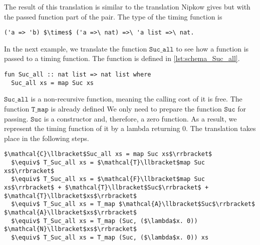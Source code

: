 The result of this translation is similar to the translation Nipkow gives but with the passed function part of the pair.
The type of the timing function is
\begin{lstlisting}[language=translation,mathescape=true,keepspaces]
  ('a => 'b) $\times$ ('a =>\ nat) =>\ 'a list =>\ nat.
\end{lstlisting}

In the next example, we translate the function $\texttt{Suc\_all}$ to see how a function is passed to a timing function.
The function is defined in \autoref{lst:schema_Suc_all}.

\begin{lstlisting}[language=isabelle,caption=Example function increasing every element in list of natural numbers,label=lst:schema_Suc_all]
fun Suc_all :: nat list => nat list where
  Suc_all xs = map Suc xs
\end{lstlisting}

$\texttt{Suc\_all}$ is a non-recursive function, meaning the calling cost of it is free.
The function $\texttt{T\_map}$ is already defined
We only need to prepare the function $\texttt{Suc}$ for passing.
$\texttt{Suc}$ is a constructor and, therefore, a zero function.
As a result, we represent the timing function of it by a lambda returning $0$.
The translation takes place in the following steps.
\begin{lstlisting}[mathescape=true,language=translation]
  $\mathcal{C}\llbracket$Suc_all xs = map Suc xs$\rrbracket$
  $\equiv$ T_Suc_all xs = $\mathcal{T}\llbracket$map Suc xs$\rrbracket$
  $\equiv$ T_Suc_all xs = $\mathcal{F}\llbracket$map Suc xs$\rrbracket$ + $\mathcal{T}\llbracket$Suc$\rrbracket$ + $\mathcal{T}\llbracket$xs$\rrbracket$
  $\equiv$ T_Suc_all xs = T_map $\mathcal{A}\llbracket$Suc$\rrbracket$ $\mathcal{A}\llbracket$xs$\rrbracket$
  $\equiv$ T_Suc_all xs = T_map (Suc, ($\lambda$x. 0)) $\mathcal{N}\llbracket$xs$\rrbracket$
  $\equiv$ T_Suc_all xs = T_map (Suc, ($\lambda$x. 0)) xs
\end{lstlisting}
